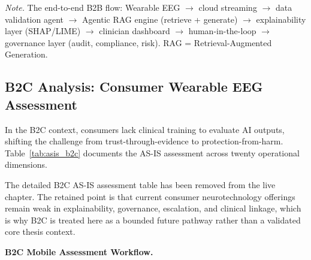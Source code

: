 \vspace{0.5em}
\noindent\textit{Note.} The end-to-end B2B flow: Wearable EEG $\to$ cloud streaming $\to$ data validation agent $\to$ Agentic RAG engine (retrieve + generate) $\to$ explainability layer (SHAP/LIME) $\to$ clinician dashboard $\to$ human-in-the-loop $\to$ governance layer (audit, compliance, risk). RAG = Retrieval-Augmented Generation.
\fi %

\label{sec:b2b_tobe}
\label{tab:b2b_tobe}

\subsection{B2C Analysis: Consumer Wearable EEG Assessment}
\label{sec:b2c_analysis}
\label{sec:asis_b2c}

In the B2C context, consumers lack clinical training to evaluate AI outputs, shifting the challenge from trust-through-evidence to protection-from-harm. Table~\ref{tab:asis_b2c} documents the AS-IS assessment across twenty operational dimensions.

\noindent The detailed B2C AS-IS assessment table has been removed from the live chapter. The retained point is that current consumer neurotechnology offerings remain weak in explainability, governance, escalation, and clinical linkage, which is why B2C is treated here as a bounded future pathway rather than a validated core thesis context.
\label{tab:asis_b2c}
\label{tab:b2c_as_is}



\noindent\textbf{B2C Mobile Assessment Workflow.}

